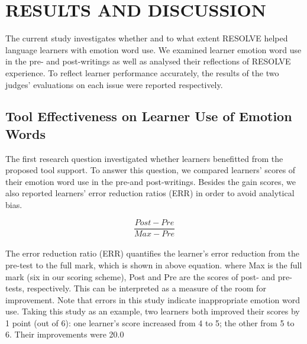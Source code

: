 \documentclass[a4paper,12pt,oneside]{article}
\begin{document}
\newpage
\section{RESULTS AND DISCUSSION}
The current study investigates whether and to what extent RESOLVE helped language learners with emotion word use. We examined learner emotion word use in the pre- and post-writings as well as analysed their reflections of RESOLVE experience. To reflect learner performance accurately, the results of the two judges’ evaluations on each issue were reported respectively. 
\subsection{Tool Effectiveness on Learner Use of Emotion Words}
The first research question investigated whether learners benefitted from the proposed tool support. To answer this question, we compared learners’ scores of their emotion word use in the pre-and post-writings. Besides the gain scores, we also reported learners’ error reduction ratios (ERR) in order to avoid analytical bias. 

\begin{equation}
    \dfrac{Post-Pre}{Max-Pre}
\end{equation}

\paragraph{}
The error reduction ratio (ERR) quantifies the learner’s error reduction from the pre-test to the full mark, which is shown in above equation. where Max is the full mark (six in our scoring scheme), Post and Pre are the scores of post- and pre-tests, respectively. This can be interpreted as a measure of the room for improvement. Note that errors in this study indicate inappropriate emotion word use. Taking this study as an example, two learners both improved their scores by 1 point (out of 6): one learner’s score increased from 4 to 5; the other from 5 to 6. Their improvements were 20.0%
\end{document}
